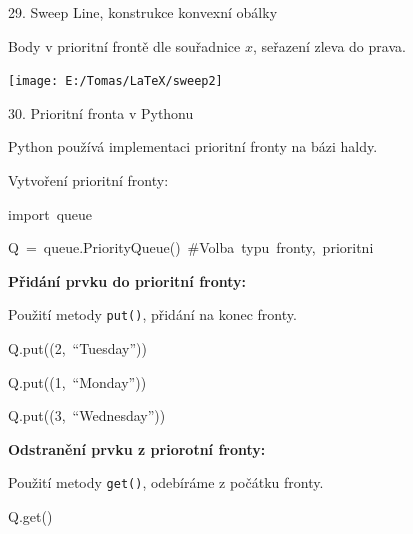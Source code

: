 \documentclass[czech]{beamer}
\newenvironment{lyxcode}
  {\par\begin{list}{}{
    \setlength{\rightmargin}{\leftmargin}
    \setlength{\listparindent}{0pt}%
    \raggedright
    \setlength{\itemsep}{0pt}
    \setlength{\parsep}{0pt}
    \normalfont\ttfamily}%
   \def\{{\char`\{}
   \def\}{\char`\}}
   \def\textasciitilde{\char`\~}
   \item[]}
  {\end{list}}
\begin{document}
\begin{frame}[plain]{29. Sweep Line, konstrukce konvexní obálky}

\noindent Body v prioritní frontě dle souřadnice $x$, seřazení zleva
do prava.
\begin{center}
\texttt{[image: E:/Tomas/LaTeX/sweep2]}
\par\end{center}

\end{frame}

\begin{frame}{30. Prioritní fronta v Pythonu}

{\footnotesize Python používá implementaci prioritní fronty na bázi
haldy.}{\footnotesize\par}

{\footnotesize\medskip{}
}{\footnotesize\par}

{\footnotesize Vytvoření prioritní fronty:}{\footnotesize\par}
\begin{lyxcode}
{\footnotesize import~queue}{\footnotesize\par}

{\footnotesize Q~=~queue.PriorityQueue()~\#Volba~typu~fronty,~prioritni}{\footnotesize\par}
\end{lyxcode}
{\footnotesize\textbf{Přidání prvku do prioritní fronty:}}{\footnotesize\par}

{\footnotesize Použití metody }{\footnotesize\texttt{put()}}{\footnotesize ,
přidání na konec fronty.}{\footnotesize\par}
\begin{lyxcode}
{\footnotesize Q.put((2,~``Tuesday''))}{\footnotesize\par}

{\footnotesize Q.put((1,~``Monday''))}{\footnotesize\par}

{\footnotesize Q.put((3,~``Wednesday''))}{\footnotesize\par}
\end{lyxcode}
{\footnotesize\textbf{Odstranění prvku z priorotní fronty:}}{\footnotesize\par}

{\footnotesize Použití metody }{\footnotesize\texttt{get()}}{\footnotesize ,
odebíráme z počátku fronty.}{\footnotesize\par}
\begin{lyxcode}
{\footnotesize Q.get()}{\footnotesize\par}


\end{lyxcode}
\end{frame}
\end{document}
